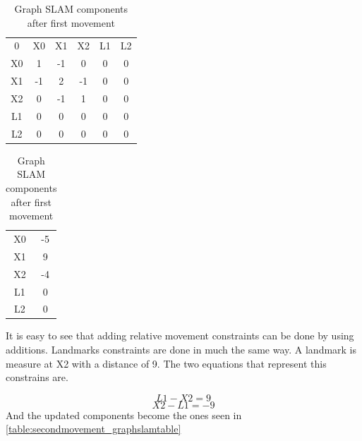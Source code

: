 \documentclass[Main]{subfiles}
\begin{document}
\begin{table}[H]
	\begin{subtable}{0.5\linewidth}
		\centering
	\begin{tabular}{cccccc}
		0 & X0 & X1 & X2 & L1 & L2 \\ 
		X0 & 1 & -1 & 0 & 0 & 0  \\ 
		X1 & -1 & 2 & -1 & 0 & 0  \\ 
		X2 & 0 & -1 & 1 & 0 & 0  \\  
		L1 & 0 & 0 & 0 & 0 & 0  \\ 
		L2 & 0 & 0 & 0 & 0 & 0  \\ 
	\end{tabular}
	\caption{$\Omega$ }
	\end{subtable}
	\begin{subtable}{0.5\linewidth}
		\centering
		\begin{tabular}{cc}
			X0 & -5 \\ 
			X1 & 9 \\ 
			X2 & -4 \\ 
			L1 & 0 \\  
			L2 & 0 \\ 
		\end{tabular}
	\caption{$\xi$}
	\end{subtable}
\caption{Graph SLAM components after first movement}
\label{table:firstmovement_graphslamtable} 
\end{table} \noindent

It is easy to see that adding relative movement constraints can be done by using additions. Landmarks constraints are done in much the same way.
A landmark is measure at X2 with a distance of 9. The two equations that represent this constrains are.

	\begin{equation}
		L1 - X2 = 9
	\end{equation}
	\begin{equation}
		X2 - L1 = -9
	\end{equation}
And the updated components become the ones seen in \autoref{table:secondmovement_graphslamtable}
\end{document}
